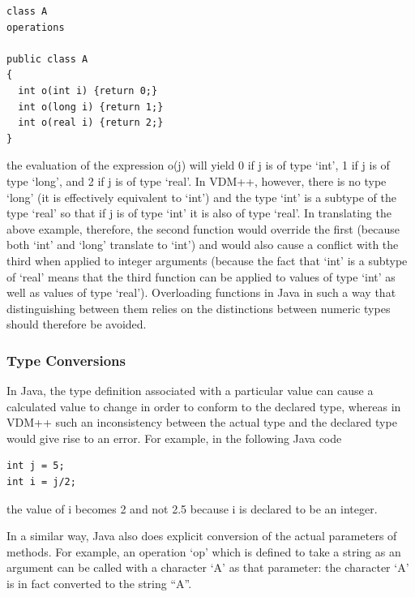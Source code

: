 \documentclass[\pformat,12pt]{article}
\begin{document}
\begin{small}
\begin{verbatim}
class A
operations

public class A 
{
  int o(int i) {return 0;}
  int o(long i) {return 1;}
  int o(real i) {return 2;}
}
\end{verbatim}
\end{small}

the evaluation of the expression o(j) will yield 0 if j is of type
`int', 1 if j is of type `long', and 2 if j is of type `real'. In
VDM++, however, there is no type `long' (it is effectively equivalent
to `int') and the type `int' is a subtype of the type `real' so that
if j is of type `int' it is also of type `real'. In translating the
above example, therefore, the second function would override the first 
(because both `int' and `long' translate to `int') and would also
cause a conflict with the third when applied to integer arguments
(because the fact that `int' is a subtype of `real' means that the
third function can be applied to values of type `int' as well as
values of type `real'). Overloading functions in Java in such a way
that distinguishing between them relies on the distinctions between
numeric types should therefore be avoided.

\subsubsection{Type Conversions}

In Java, the type definition associated with a particular value can
cause a calculated value to change in order to conform to the declared
type, whereas in VDM++ such an inconsistency between the actual type
and the declared type would give rise to an error. For example, in the 
following Java code

\begin{small}
\begin{verbatim}
int j = 5;
int i = j/2;
\end{verbatim}
\end{small}

the value of i becomes 2 and not 2.5 because i is declared to be an
integer. 

In a similar way, Java also does explicit conversion of the actual
parameters of methods. For example, an operation `op' which is defined
to take a string as an argument can be called with a character `A' as
that parameter: the character `A' is in fact converted to the string
``A''. 
\end{document}
